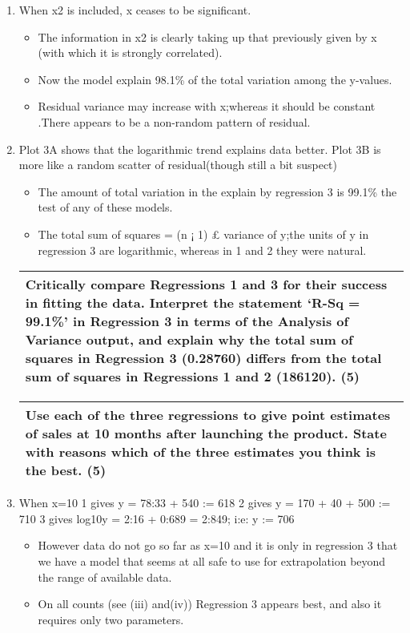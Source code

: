 \documentclass[a4paper,12pt]{article}
\begin{document}
\begin{enumerate}
\item When x2 is included, x ceases to be significant.
\begin{itemize}
    \item The information in x2 is clearly
taking up that previously given by x (with which it is strongly correlated).
\item Now the model
explain 98.1\% of the total variation among the y-values.
\item Residual variance may increase with x;whereas it should be constant .There appears to
be a non-random pattern of residual.
\end{itemize}
\item Plot 3A shows that the logarithmic trend explains data better. Plot 3B is more
like a random scatter of residual(though still a bit suspect)
\begin{itemize}
\item The amount of total variation
in the explain by regression 3 is 99.1\% the test of any of these models.
\item The total sum of squares = (n ¡ 1) £ variance of y;the units of y in regression 3 are
logarithmic, whereas in 1 and 2 they were natural.
\end{itemize}
  \begin{table}[ht!]
     \centering
     \begin{tabular}{|p{15cm}|}
     \hline  
 
Critically compare Regressions 1 and 3 for their success in fitting the data.  Interpret the statement ‘R-Sq = 99.1\%’ in Regression 3 in terms of the Analysis of Variance output, and explain why the total sum of squares in Regression 3 (0.28760) differs from the total sum of squares in Regressions 1 and 2 (186120). (5) 
  \\ \hline
      \end{tabular}
    \end{table}
    
  \begin{table}[ht!]
     \centering
     \begin{tabular}{|p{15cm}|}
     \hline  
 Use each of the three regressions to give point estimates of sales at 10 months after launching the product.  State with reasons which of the three estimates you think is the best. (5)   
 \\ \hline 
      \end{tabular}
    \end{table}
\item When x=10
1 gives y = 78:33 + 540
:=
618
2 gives y = 170 + 40 + 500
:=
710
3 gives log10y = 2:16 + 0:689 = 2:849; i:e: y
:=
706
\begin{itemize}
    \item However data do not go so far as x=10 and it is only in regression 3 that we have a
model that seems at all safe to use for extrapolation beyond the range of available data.
\item On all counts (see (iii) and(iv)) Regression 3 appears best, and also it requires only two
parameters.
\end{itemize}

\end{enumerate}
\end{document}
